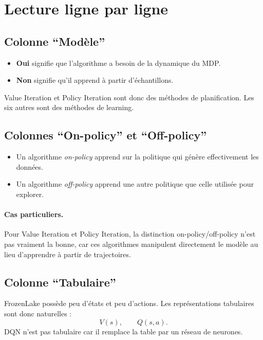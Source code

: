 \documentclass[11pt,a4paper]{article}
\begin{document}
\section{Lecture ligne par ligne}

\subsection{Colonne ``Modèle''}

\begin{itemize}[leftmargin=1.6em]
    \item \textbf{Oui} signifie que l'algorithme a besoin de la dynamique du MDP.
    \item \textbf{Non} signifie qu'il apprend à partir d'échantillons.
\end{itemize}

Value Iteration et Policy Iteration sont donc des méthodes de planification. Les six autres sont des méthodes de learning.

\subsection{Colonnes ``On-policy'' et ``Off-policy''}

\begin{itemize}[leftmargin=1.6em]
    \item Un algorithme \emph{on-policy} apprend sur la politique qui génère effectivement les données.
    \item Un algorithme \emph{off-policy} apprend une autre politique que celle utilisée pour explorer.
\end{itemize}

\paragraph{Cas particuliers.}
Pour Value Iteration et Policy Iteration, la distinction on-policy/off-policy n'est pas vraiment la bonne, car ces algorithmes manipulent directement le modèle au lieu d'apprendre à partir de trajectoires.

\subsection{Colonne ``Tabulaire''}

FrozenLake possède peu d'états et peu d'actions. Les représentations tabulaires sont donc naturelles :
\[
V(s), \qquad Q(s,a).
\]
DQN n'est pas tabulaire car il remplace la table par un réseau de neurones.
\end{document}
